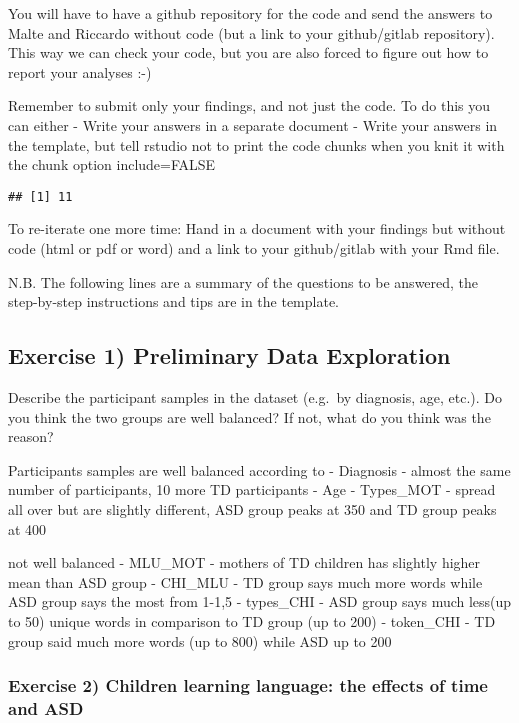 \documentclass[]{article}
\begin{document}
You will have to have a github repository for the code and send the
answers to Malte and Riccardo without code (but a link to your
github/gitlab repository). This way we can check your code, but you are
also forced to figure out how to report your analyses :-)

Remember to submit only your findings, and not just the code. To do this
you can either - Write your answers in a separate document - Write your
answers in the template, but tell rstudio not to print the code chunks
when you knit it with the chunk option include=FALSE

\begin{verbatim}
## [1] 11
\end{verbatim}

To re-iterate one more time: Hand in a document with your findings but
without code (html or pdf or word) and a link to your github/gitlab with
your Rmd file.

N.B. The following lines are a summary of the questions to be answered,
the step-by-step instructions and tips are in the template.

\subsection{Exercise 1) Preliminary Data
Exploration}\label{exercise-1-preliminary-data-exploration}

Describe the participant samples in the dataset (e.g.~by diagnosis, age,
etc.). Do you think the two groups are well balanced? If not, what do
you think was the reason?

Participants samples are well balanced according to - Diagnosis - almost
the same number of participants, 10 more TD participants - Age -
Types\_MOT - spread all over but are slightly different, ASD group peaks
at 350 and TD group peaks at 400

not well balanced - MLU\_MOT - mothers of TD children has slightly
higher mean than ASD group - CHI\_MLU - TD group says much more words
while ASD group says the most from 1-1,5 - types\_CHI - ASD group says
much less(up to 50) unique words in comparison to TD group (up to 200) -
token\_CHI - TD group said much more words (up to 800) while ASD up to
200

\subsubsection{Exercise 2) Children learning language: the effects of
time and
ASD}\label{exercise-2-children-learning-language-the-effects-of-time-and-asd}
\end{document}
